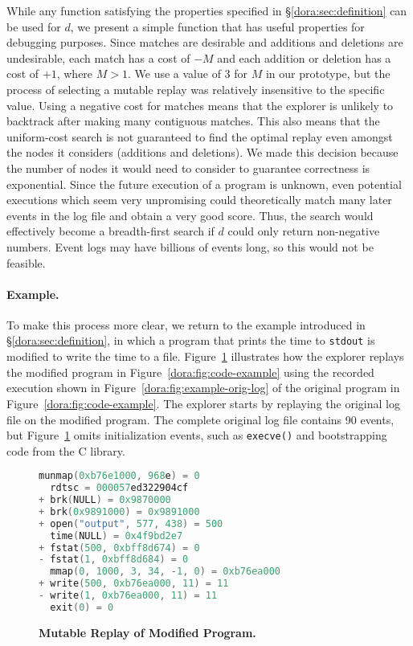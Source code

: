 While any function satisfying the properties specified in
\S\ref{dora:sec:definition} can be used for $d$, we present a simple
function that has useful properties for debugging purposes.
Since matches are desirable and additions and deletions are undesirable,
each match has a cost of $-M$ and each addition or deletion has a cost of
$+1$, where $M > 1$. We use a value of $3$ for $M$ in our prototype,
but the process of selecting a mutable replay was relatively
insensitive to the specific value.
Using a negative cost for matches
means that the explorer is unlikely to backtrack after making many
contiguous matches.  This also means that the uniform-cost search
is not guaranteed to find the optimal replay even amongst the nodes it
considers (additions and deletions).  We made this decision because
the number of nodes it would need to consider to guarantee correctness
is exponential. Since the future execution of a program is 
unknown, even potential executions which seem very unpromising could
theoretically match many later events in the log file and obtain a very good
score. Thus, the search would effectively become a breadth-first search if $d$
could only return non-negative numbers.  Event logs may have billions of
events long, so this would not be feasible.

\paragraph{Example.}
To make this process more clear, we return to the example introduced in
\S\ref{dora:sec:definition}, in which a program that prints the time to
{\tt stdout} is modified to write the time to a file.
Figure~\ref{dora:fig:diff} illustrates how the explorer replays the
modified program in Figure~\ref{dora:fig:code-example} using the recorded execution
shown in Figure~\ref{dora:fig:example-orig-log} of the original program in 
Figure~\ref{dora:fig:code-example}. The explorer starts by replaying the
original log file on the modified program. The complete original log file
contains 90 events, but Figure~\ref{dora:fig:diff} omits initialization
events, such as {\tt execve()} and bootstrapping code from the C library. 

\begin{figure}
\centering
\begin{minipage}{.62\textwidth}
\small
\begin{rbox}
\begin{lstlisting}[language=C,basicstyle=\ttfamily]
  munmap(0xb76e1000, 968e) = 0
  rdtsc = 000057ed322904cf
+ brk(NULL) = 0x9870000
+ brk(0x9891000) = 0x9891000
+ open("output", 577, 438) = 500
  time(NULL) = 0x4f9bd2e7
+ fstat(500, 0xbff8d674) = 0
- fstat(1, 0xbff8d684) = 0
  mmap(0, 1000, 3, 34, -1, 0) = 0xb76ea000
+ write(500, 0xb76ea000, 11) = 11
- write(1, 0xb76ea000, 11) = 11
  exit(0) = 0
\end{lstlisting}
\end{rbox}
\end{minipage}
\caption{{\bf Mutable Replay of Modified Program.}}
\label{dora:fig:diff}
\end{figure}

